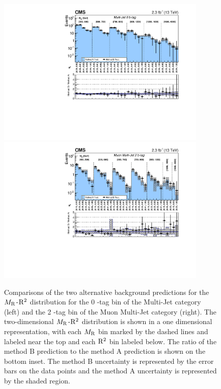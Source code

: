 \begin{figure}[!htb] \centering
\includegraphics[width=0.9\textwidth]{figs/analysis13TeV/results/MRRsqMultiJet0BTagMCTotalUnrolledMCFit.pdf}
\includegraphics[width=0.9\textwidth]{figs/analysis13TeV/results/MRRsqMuMultiJet2BTagMCTotalUnrolledMCFit.pdf}
\caption{Comparisons of the two alternative background predictions for the $M_\mathrm{R}$-$\mathrm{R}^2$ distribution 
for the 0 \PQb-tag bin of the Multi-Jet category (left) and the 2 \PQb-tag bin of the Muon Multi-Jet
category (right). The two-dimensional $M_\mathrm{R}$-$\mathrm{R}^2$ distribution is shown
in a one dimensional representation, with each $M_\mathrm{R}$ bin marked by the dashed lines and labeled near the top
and each $\mathrm{R}^2$ bin labeled below. The ratio of the method B prediction to the method A prediction is shown 
on the bottom inset. The method B uncertainty is represented by the error bars on the data points and the
method A uncertainty is represented by the shaded region. 
} 
\label{fig:FitVsMADD}
\end{figure}

